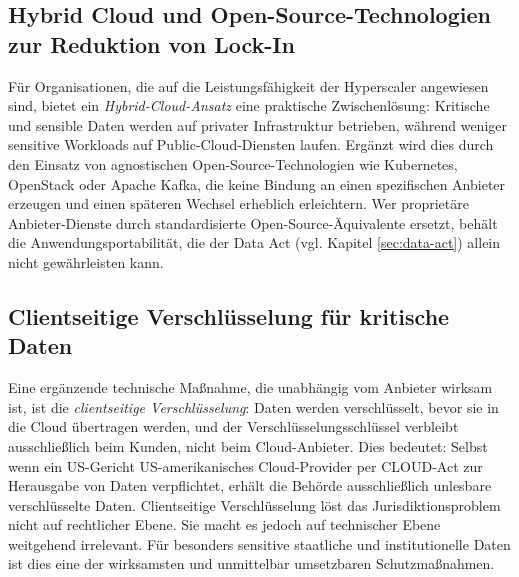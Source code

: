 \subsection{Hybrid Cloud und Open-Source-Technologien 
zur Reduktion von Lock-In}

Für Organisationen, die auf die Leistungsfähigkeit 
der Hyperscaler angewiesen sind, bietet ein 
\textit{Hybrid-Cloud-Ansatz} eine praktische 
Zwischenlösung: Kritische und sensible Daten werden 
auf privater Infrastruktur betrieben, 
während weniger sensitive Workloads auf Public-Cloud-Diensten 
laufen. Ergänzt wird dies durch den Einsatz von 
agnostischen Open-Source-Technologien wie Kubernetes, OpenStack 
oder Apache Kafka, die keine Bindung an einen 
spezifischen Anbieter erzeugen und einen späteren 
Wechsel erheblich erleichtern. Wer proprietäre 
Anbieter-Dienste durch standardisierte Open-Source-Äquivalente 
ersetzt, behält die Anwendungsportabilität, die der 
Data Act (vgl. Kapitel \ref{sec:data-act}) allein nicht gewährleisten kann.

\subsection{Clientseitige Verschlüsselung 
für kritische Daten}

Eine ergänzende technische Maßnahme, die unabhängig 
vom Anbieter wirksam ist, ist die \textit{clientseitige 
Verschlüsselung}: Daten werden verschlüsselt, bevor 
sie in die Cloud übertragen werden, und der 
Verschlüsselungsschlüssel verbleibt ausschließlich 
beim Kunden, nicht beim Cloud-Anbieter. Dies bedeutet: 
Selbst wenn ein US-Gericht US-amerikanisches Cloud-Provider per \ac{CLOUD-Act} zur 
Herausgabe von Daten verpflichtet, erhält die Behörde 
ausschließlich unlesbare verschlüsselte Daten. 
Clientseitige Verschlüsselung löst das 
Jurisdiktionsproblem nicht auf rechtlicher Ebene.
Sie macht es jedoch auf technischer Ebene weitgehend 
irrelevant. Für besonders sensitive staatliche und 
institutionelle Daten ist dies eine der wirksamsten 
und unmittelbar umsetzbaren Schutzmaßnahmen.
